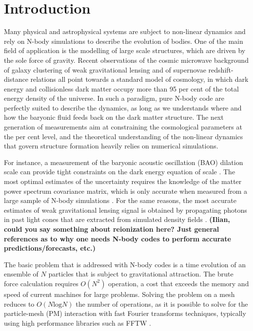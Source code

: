 \section{Introduction}

Many physical and astrophysical systems are subject to non-linear dynamics
and rely on N-body simulations to describe the evolution of bodies. 
One of the main field of application is the modelling of large scale structures, 
which are driven by the sole force of gravity. Recent observations of the cosmic microwave background
\citep{WMAP5-7} of galaxy clustering \citep{2000AJ....120.1579Y, 2003astro.ph..6581C, 2009arXiv0902.4680S, 2010MNRAS.401.1429D} of weak gravitational lensing \citep{CFHTLS, SDSS}
and of supernovae redshift-distance relations all point towards a standard model of cosmology, in which dark energy
and collisionless dark matter occupy more than 95 per cent of the total energy density of the universe.
In such a paradigm, pure N-body code are perfectly suited to describe the dynamics, as long as we
understands where and how the baryonic fluid feeds back on the dark matter structure.
The next generation of measurements aim at constraining the cosmological parameters at the per cent level, 
and the theoretical understanding of the non-linear dynamics that govern structure formation heavily relies 
on numerical simulations. 

For instance, a measurement of the baryonic acoustic oscillation (BAO) dilation scale can provide
tight constraints on the dark energy equation of scale \citep{Seo2003,2005}.
The most optimal estimates of the uncertainty requires the knowledge of the 
matter power spectrum covariance matrix, which is only accurate when measured from a large sample 
of N-body simulations \citep{2005MNRAS.360L..82R, 2009ApJ...700..479T, 2011ApJ...726....7T}.
For the same reasons, the most accurate estimates of weak gravitational lensing signal is obtained
by propagating photons in past light cones that are extracted from simulated density fields \citep{2003ApJ...592..699V, 2009ApJ...701..945S, 2009A&A...499...31H}.
{\bf (Ilian, could you say something about reionization here? Just general references as to why one needs N-body codes to perform 
accurate predictions/forecasts, etc.)}

The basic problem that is addressed with N-body codes is a time evolution of an ensemble of $N$ particles
that is subject to gravitational attraction. The brute force calculation requires $O(N^{2})$ operation, a cost that 
exceeds the memory and speed of current machines for large problems.
Solving the problem  on a mesh \citep{1981csup.book.....H} reduces to $O(N\mbox{log}N)$ the number of operations,
as it is possible to solve for the particle-mesh (PM) interaction with fast Fourier transforms techniques, 
typically using high performance libraries such as {\small FFTW} \citep{FFTW3}.


